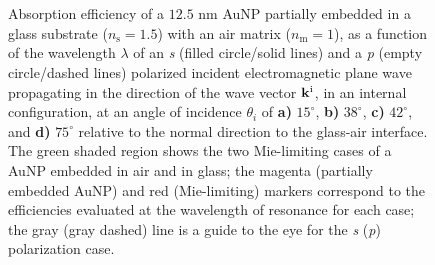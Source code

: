 \begin{figure}[t!]\small \centering
    \hspace*{-.675\textwidth}%
        \begin{subfigure}{.735\textwidth}\caption{ }\label{sfig:Inc:Abs:15}\end{subfigure}%
        \begin{subfigure}{.25\textwidth}\caption{ }\label{sfig:Inc:Abs:38}\end{subfigure} \\[17em]
    \hspace*{-.675\textwidth}%
        \begin{subfigure}{.735\textwidth}\caption{ }\label{sfig:Inc:Abs:42}\end{subfigure}%
        \begin{subfigure}{.25\textwidth}\caption{ }\label{sfig:Inc:Abs:75}\end{subfigure} \\[-19.9em]
    \def\svgwidth{.95\textwidth}
    \vspace*{-.5em}
    \caption[Absorption Efficiency of a partially embedded 12.5 nm AuNP into a substrate Illuminated in an internal configuration at oblique incidence]{%
    Absorption efficiency of a $12.5$ nm AuNP partially embedded in a glass substrate ($n_\text{s} = 1.5$) with an air matrix ($n_\text{m} = 1$), as a function of the wavelength $\lambda$ of an \textit{s} (filled circle/solid lines) and a \textit{p} (empty circle/dashed lines) polarized incident electromagnetic plane wave propagating in the direction of the wave vector $\vb{k}^\text{i}$, in an internal configuration, at an angle of incidence $\theta_i$ of \textbf{a)} $15^\circ$, \textbf{b)} $38^\circ$, \textbf{c)} $42^\circ$, and \textbf{d)} $75^\circ$  relative to the normal direction to the glass-air interface. The green shaded region shows the two Mie-limiting cases of a AuNP embedded in air
and in glass; the magenta (partially embedded AuNP) and red (Mie-limiting) markers correspond to the efficiencies evaluated at the wavelength of resonance for each case; the gray (gray dashed) line is a guide to the eye for the \textit{s} (\textit{p}) polarization case.
}
\label{fig:Inc:Abs}
\end{figure}

